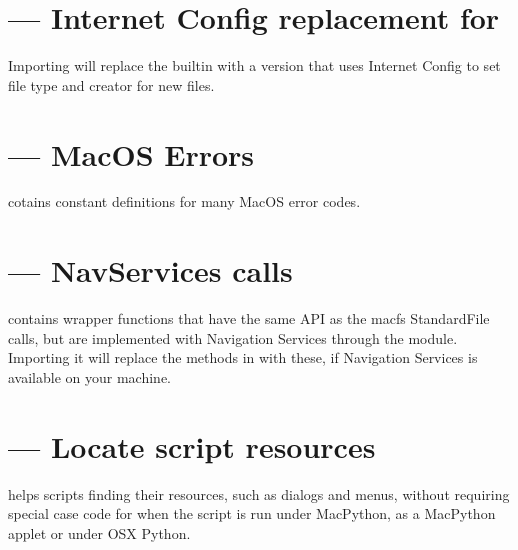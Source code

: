 \section{ --- Internet Config replacement for }

Importing  will replace the builtin 
with a version that uses Internet Config to set file type and creator
for new files.


\section{ --- MacOS Errors}

 cotains constant definitions for many MacOS error codes.


\section{ --- NavServices calls}


 contains wrapper functions that have the same API as the macfs 
StandardFile calls, but are implemented with Navigation Services through the
 module. Importing it 
will replace the methods in  with these,
if Navigation Services is 
available on your machine.


\section{ --- Locate script resources}

 helps scripts finding their resources, such as
dialogs and menus, without requiring special case code for when the
script is run under MacPython, as a MacPython applet or under OSX Python.

